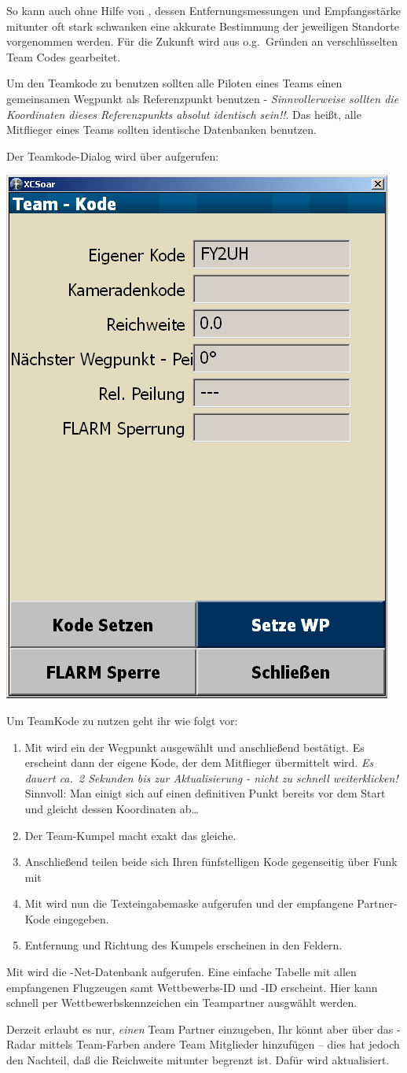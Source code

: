 So kann  auch ohne Hilfe von  \fl, dessen Entfernungsmessungen und Empfangsstärke
 mitunter oft stark schwanken  eine akkurate Bestimmung der jeweiligen Standorte vorgenommen werden.
Für die Zukunft wird aus o.g.\ Gründen an verschlüsselten Team Codes gearbeitet.

Um den Teamkode zu benutzen sollten alle Piloten eines Teams einen gemeinsamen Wegpunkt als Referenzpunkt
benutzen - \textsl{Sinnvollerweise sollten die Koordinaten  dieses Referenzpunkts absolut identisch sein!!}.
Das heißt, alle Mitflieger eines Teams sollten identische Datenbanken benutzen.

Der Teamkode-Dialog wird über
\blink{}\blink{}
aufgerufen:
\begin{center}
\includegraphics[angle=0,width=0.5\linewidth,keepaspectratio='true']{figures/dialog-teamcode.png}
\end{center}

Um TeamKode zu nutzen geht ihr wie folgt vor:
\begin{enumerate}
\item Mit  wird ein der Wegpunkt ausgewählt und anschließend bestätigt.
Es erscheint dann der eigene Kode, der dem Mitflieger übermittelt wird. \achtung \textsl{Es dauert ca.\
2 Sekunden bis zur Aktualisierung - nicht zu schnell weiterklicken!}
Sinnvoll: Man einigt sich auf einen definitiven Punkt bereits vor dem Start und gleicht dessen Koordinaten ab\dots
\item Der Team-Kumpel macht exakt das gleiche.
\item Anschließend teilen beide sich Ihren fünfstelligen Kode gegenseitig über Funk mit
\item Mit \button{Kode Setzen} wird nun die Texteingabemaske aufgerufen und der empfangene Partner-Kode eingegeben.
\item Entfernung und Richtung des Kumpels erscheinen in den Feldern.
\end{enumerate}
Mit   wird die \fl-Net-Datenbank aufgerufen.
Eine einfache  Tabelle  mit allen empfangenen Flugzeugen samt Wettbewerbs-ID und \fl-ID erscheint.
Hier kann schnell per Wettbewerbskennzeichen ein Teampartner ausgwählt werden.

Derzeit erlaubt  es \xc nur, \textsl{einen} Team Partner einzugeben, Ihr könnt aber über
das \fl-Radar mittels Team-Farben andere Team Mitglieder hinzufügen -- dies hat jedoch den Nachteil,
daß die Reichweite mitunter begrenzt ist. Dafür wird aktualisiert.
